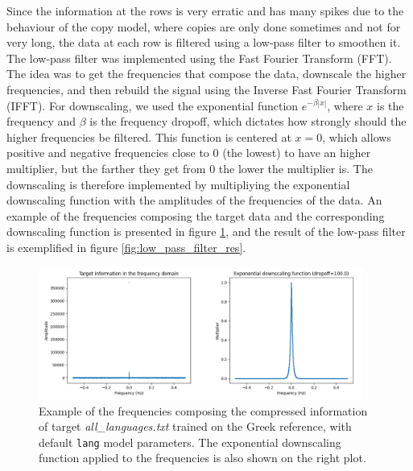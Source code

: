 \documentclass{article}
\begin{document}
Since the information at the rows is very erratic and has many spikes due to the behaviour of the copy model, where copies are only done sometimes and not for very long, the data at each row is filtered using a low-pass filter to smoothen it.
The low-pass filter was implemented using the Fast Fourier Transform (FFT).
The idea was to get the frequencies that compose the data, downscale the higher frequencies, and then rebuild the signal using the Inverse Fast Fourier Transform (IFFT).
For downscaling, we used the exponential function $e^{-\beta|x|}$, where $x$ is the frequency and $\beta$ is the frequency dropoff, which dictates how strongly should the higher frequencies be filtered.
This function is centered at $x=0$, which allows positive and negative frequencies close to 0 (the lowest) to have an higher multiplier, but the farther they get from 0 the lower the multiplier is.
The downscaling is therefore implemented by multipliying the exponential downscaling function with the amplitudes of the frequencies of the data.
An example of the frequencies composing the target data and the corresponding downscaling function is presented in figure \ref{fig:low_pass_filter}, and the result of the low-pass filter is exemplified in figure \ref{fig:low_pass_filter_res}.

\begin{figure}
    \centering
    \includegraphics[width=0.95\textwidth]{./images/low_pass_filter.png}
    \caption{Example of the frequencies composing the compressed information of target \textit{all\_languages.txt} trained on the Greek reference, with default \texttt{lang} model parameters. The exponential downscaling function applied to the frequencies is also shown on the right plot.}
    \label{fig:low_pass_filter}
\end{figure}
\end{document}
